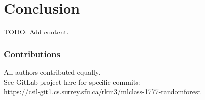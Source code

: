 \documentclass{article} %
\begin{document}
\section{Conclusion}
TODO: Add content.


\subsubsection*{Contributions}
All authors contributed equally.\\
See GitLab project here for specific commits:\\
\href{
    https://csil-git1.cs.surrey.sfu.ca/rkm3/mlclass-1777-randomforest
}{
    https://csil-git1.cs.surrey.sfu.ca/rkm3/mlclass-1777-randomforest
}


\small{


}
\end{document}
